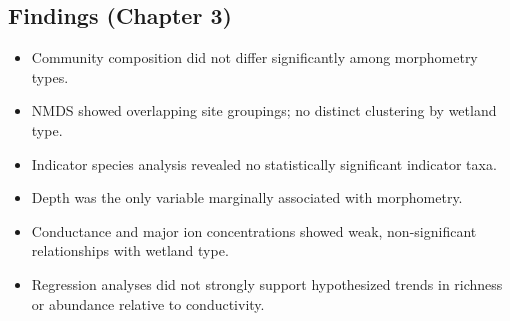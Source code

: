\subsection{Findings (Chapter 3)}
\begin{itemize}
  \item Community composition did not differ significantly among morphometry types.
  \item NMDS showed overlapping site groupings; no distinct clustering by wetland type.
  \item Indicator species analysis revealed no statistically significant indicator taxa.
  \item Depth was the only variable marginally associated with morphometry.
  \item Conductance and major ion concentrations showed weak, non-significant relationships with wetland type.
  \item Regression analyses did not strongly support hypothesized trends in richness or abundance relative to conductivity.
\end{itemize}

